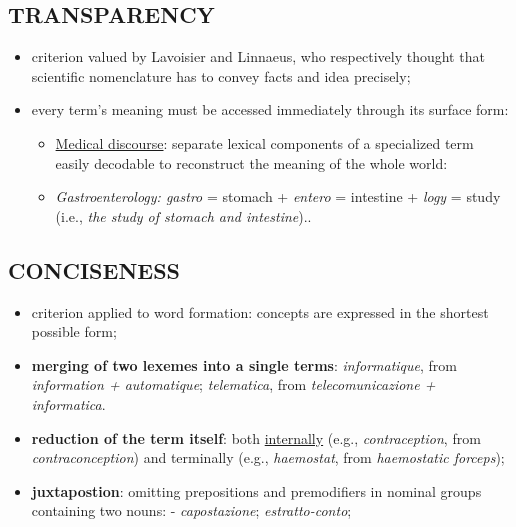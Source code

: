 \subsection{TRANSPARENCY}

\begin{itemize}

\item criterion valued by Lavoisier and Linnaeus, who respectively thought that scientific nomenclature has to convey facts and idea precisely;

\item every term’s meaning must be accessed immediately through its surface form:

\begin{itemize}

\item \underline{Medical discourse}: separate lexical components of a specialized term easily decodable to reconstruct the meaning of the whole world:

\item \textit{Gastroenterology: gastro} = stomach + \textit{entero} = intestine + \textit{logy} = study (i.e., \textit{the study of stomach and intestine}).. 

\end{itemize}

\end{itemize}

\subsection{CONCISENESS}

\begin{itemize}

\item criterion applied to word formation: concepts are expressed in the shortest possible form;
\item \textbf{merging of two lexemes into a single terms}:  \textit{informatique}, from \textit{information + automatique}; \textit{telematica}, from \textit{telecomunicazione + informatica}.
\item \textbf{reduction of the term itself}:  both \underline{internally} (e.g., \textit{contraception}, from \textit{contraconception}) and terminally (e.g., \textit{haemostat}, from \textit{haemostatic forceps});
\item \textbf{juxtapostion}: omitting prepositions and premodifiers in nominal groups containing two nouns: - \textit{capostazione}; \textit{estratto-conto};

\end{itemize}

